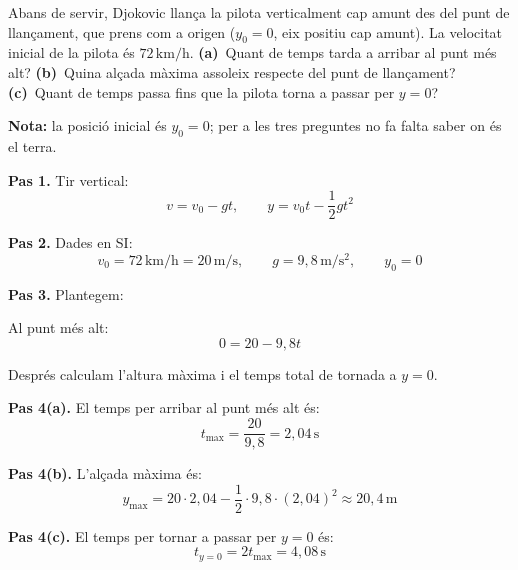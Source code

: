 \documentclass[11pt,a4paper]{article}
\begin{document}
Abans de servir, Djokovic llança la pilota verticalment cap amunt des del punt de llançament, que prens com a origen ($y_0=0$, eix positiu cap amunt). La velocitat inicial de la pilota és $72\,\mathrm{km/h}$. \textbf{(a)}~Quant de temps tarda a arribar al punt més alt? \textbf{(b)}~Quina alçada màxima assoleix respecte del punt de llançament? \textbf{(c)}~Quant de temps passa fins que la pilota torna a passar per $y=0$?

\begin{center}
\end{center}

\textbf{Nota:} la posició inicial és $y_0=0$; per a les tres preguntes no fa falta saber on és el terra.

\begin{solutionbox}
\textbf{Pas 1.} Tir vertical:
\[
v=v_0-gt, \qquad y=v_0t-\frac{1}{2}gt^2
\]

\textbf{Pas 2.} Dades en SI:
\[
v_0=72\,\mathrm{km/h}=20\,\mathrm{m/s}, \qquad g=9{,}8\,\mathrm{m/s^2}, \qquad y_0=0
\]

\textbf{Pas 3.} Plantegem:

Al punt més alt:
\[
0=20-9{,}8t
\]

Després calculam l'altura màxima i el temps total de tornada a $y=0$.

\textbf{Pas 4(a).} El temps per arribar al punt més alt és:
\[
t_{\max}=\frac{20}{9{,}8}=2{,}04\,\mathrm{s}
\]

\textbf{Pas 4(b).} L'alçada màxima és:
\[
y_{\max}=20\cdot 2{,}04-\frac{1}{2}\cdot 9{,}8\cdot (2{,}04)^2\approx 20{,}4\,\mathrm{m}
\]

\textbf{Pas 4(c).} El temps per tornar a passar per $y=0$ és:
\[
t_{y=0}=2t_{\max}=4{,}08\,\mathrm{s}
\]
\end{solutionbox}
\end{document}
